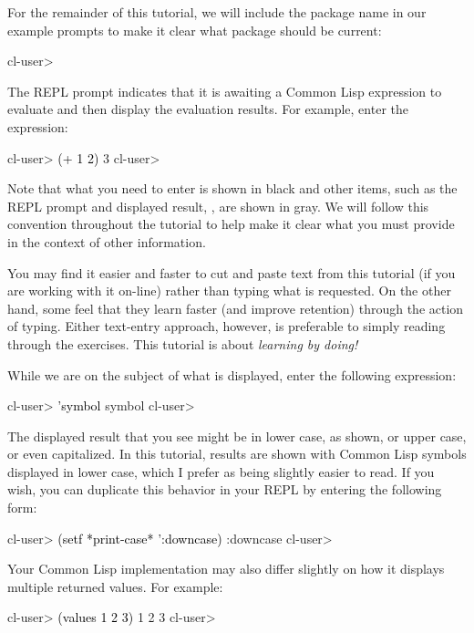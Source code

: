 \documentclass[10pt,twoside,english,pdftex]{article}
\begin{document}
For the remainder of this tutorial, we will include the package name in our
example prompts to make it clear what package should be current:
%
\W\supp
\begin{example}%
\textcolor{darkergray}{%
  cl-user>}
\end{example}
%
The REPL prompt indicates that it is awaiting a Common Lisp expression to
evaluate and then display the evaluation results. For example, enter the
expression:
%
\W\supp\notpretop
\begin{example}
\textcolor{darkergray}{%
  cl-user> \textcolor{black}{(+ 1 2)}
  3
  cl-user>}
\end{example}
%
Note that what you need to enter is shown in black and other items, such as
the REPL prompt and displayed result, , are shown in gray.  We will
follow this convention throughout the tutorial to help make it clear what you
must provide in the context of other information.

You may find it easier and faster to cut and paste text from this tutorial (if
you are working with it on-line) rather than typing what is requested.  On the
other hand, some feel that they learn faster (and improve retention) through
the action of typing.  Either text-entry approach, however, is preferable to
simply reading through the exercises.  This tutorial is about \textit{learning by doing!}

%
While we are on the subject of what is displayed, enter the following
expression:
%
\W\supp
\begin{example}
\textcolor{darkergray}{%
  cl-user> \textcolor{black}{'symbol}
  symbol
  cl-user>}
\end{example}
%
The displayed result that you see might be in lower case, as shown, or upper
case, or even capitalized.  In this tutorial, results are shown with Common
Lisp symbols displayed in lower case, which I prefer as being slightly easier
to read.  If you wish, you can duplicate this behavior in your REPL by
entering the following form:
%
\W\supp\notpretop
\begin{example}
\textcolor{darkergray}{%
  cl-user> \textcolor{black}{(setf *print-case* ':downcase)}
  :downcase
  cl-user>}
\end{example}

%
Your Common Lisp implementation may also differ slightly on how it displays
multiple returned values.  For example:
%
\W\supp
\begin{example}
\textcolor{darkergray}{%
  cl-user> \textcolor{black}{(values 1 2 3)}
  1
  2
  3
  cl-user>}
\end{example}
\end{document}
